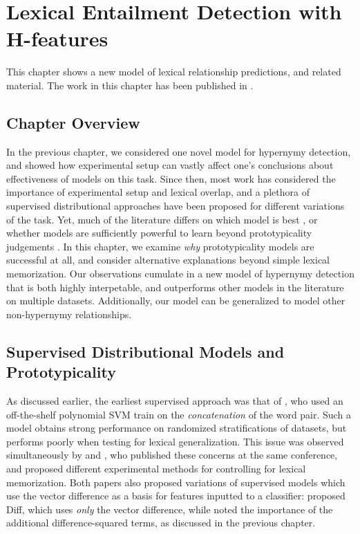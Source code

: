 \chapter{Lexical Entailment Detection with H-features}
\label{ch:hpm}

This chapter shows a new model of lexical relationship predictions, and related
material. The work in this chapter has been published in
.

\section{Chapter Overview}

In the previous chapter, we considered one novel model for hypernymy detection,
and showed how experimental setup can vastly affect one's conclusions about
effectiveness of models on this task. Since then, most work has considered the
importance of experimental setup and lexical overlap, and a plethora of
supervised distributional approaches have been proposed for different variations
of the task. Yet, much of the literature differs on which model is best
\cite{weeds:2014:coling,roller:2014:coling}, or whether models are sufficiently
powerful to learn beyond prototypicality judgements \cite{levy:2015:naacl}.
In this chapter, we examine {\em why} prototypicality models are
successful at all, and consider alternative explanations beyond simple lexical
memorization. Our observations cumulate in a new model of hypernymy detection
that is both highly interpetable, and outperforms other models in the literature
on multiple datasets. Additionally, our model can be generalized to model
other non-hypernymy relationships.

\section{Supervised Distributional Models and Prototypicality}

As discussed earlier, the earliest supervised approach was that of
, who used an off-the-shelf polynomial SVM train on
the {\em concatenation} of the word pair. Such a model obtains strong
performance on randomized stratifications of datasets, but performs poorly
when testing for lexical generalization. This issue was observed simultaneously
by  and , who published
these concerns at the same conference, and proposed different experimental
methods for controlling for lexical memorization. Both papers also proposed
variations of supervised models which use the vector difference as a basis
for features inputted to a classifier:  proposed
Diff, which uses {\em only} the vector difference, while
 noted the importance of the additional
difference-squared terms, as discussed in the previous chapter.

